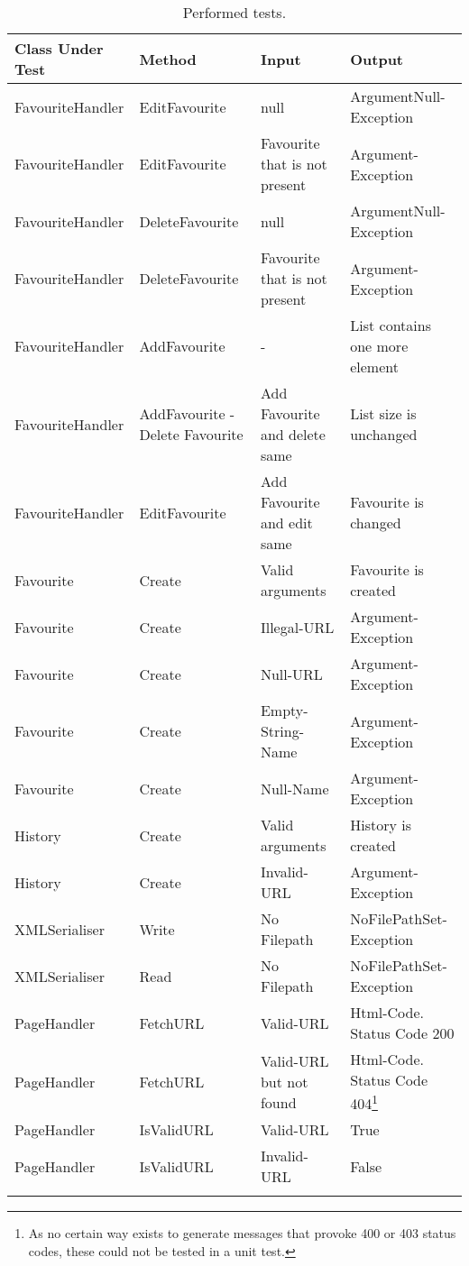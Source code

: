 \begin{longtable}{X X X X}
\hline Class Under Test & Method & Input & Output \\
\hline 
\hline FavouriteHandler & EditFavourite & null & ArgumentNull-Exception \\
\hline FavouriteHandler & EditFavourite & Favourite that is not present & Argument-Exception \\
\hline FavouriteHandler & DeleteFavourite & null & ArgumentNull-Exception \\
\hline FavouriteHandler & DeleteFavourite & Favourite that is not present & Argument-Exception \\
\hline FavouriteHandler & AddFavourite & - & List contains one more element \\
\hline FavouriteHandler & AddFavourite - Delete Favourite & Add Favourite and delete same & List size is unchanged \\
\hline FavouriteHandler & EditFavourite & Add Favourite and edit same & Favourite is changed \\
\hline
\hline Favourite & Create & Valid arguments & Favourite is created \\
\hline Favourite & Create & Illegal-\ac{URL} & Argument-Exception \\
\hline Favourite & Create & Null-\ac{URL} & Argument-Exception \\
\hline Favourite & Create & Empty-String-Name & Argument-Exception \\
\hline Favourite & Create & Null-Name & Argument-Exception \\
\hline
\hline History & Create & Valid arguments & History is created \\
\hline History & Create & Invalid-\ac{URL} & Argument-Exception \\
\hline
\hline \ac{XML}Serialiser & Write & No Filepath & NoFilePathSet-Exception \\
\hline \ac{XML}Serialiser & Read & No Filepath & NoFilePathSet-Exception \\
\hline
\hline PageHandler & Fetch\ac{URL} & Valid-\ac{URL} & Html-Code. Status Code 200 \\
\hline PageHandler & Fetch\ac{URL} & Valid-\ac{URL} but not found & Html-Code. Status Code 404\footnote{As no certain way exists to generate messages that provoke 400 or 403 status codes, these could not be tested in a unit test.} \\
\hline PageHandler & IsValid\ac{URL} & Valid-\ac{URL} & True \\
\hline PageHandler & IsValid\ac{URL} & Invalid-\ac{URL} & False \\
\caption{Performed tests.}
\end{longtable}